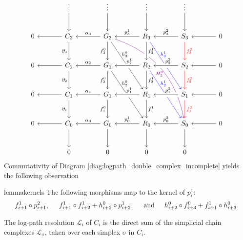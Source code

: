 \begin{equation} \label{diag:logpath_double_complex}
\begin{tikzcd} [column sep=large,row sep=large]
& \vdots \arrow[d] & \vdots \arrow[d] & \vdots \arrow[d] & \vdots \arrow[d] \\
0 & C_3 \arrow[l] \arrow[d,swap,"\partial_3"] & G_3 \arrow[l,swap,"\alpha_3"] \arrow[d,swap,"f_3^0"] \arrow[ddr,"h_3^0"{xshift=-10pt,yshift=10pt}] \arrow[dddrr,violet,bend left,"H_3^0"{xshift=-10pt,yshift=-14pt}] & R_3 \arrow[l,swap,"p_3^1"] \arrow[d,crossing over,"f_3^1"] \arrow[ddr,blue,"h_3^1"{xshift=-10pt,yshift=10pt}] & S_3 \arrow[l,swap,"p^2_3"] \arrow[d,red,"f_3^2"] & 0 \arrow[l] \\
0 & C_2 \arrow[l] \arrow[d,swap,"\partial_2"] & G_2 \arrow[l,swap,"\alpha_2"] \arrow[d,swap,"f_2^0"] \arrow[ddr,"h_2^0"{xshift=-10pt,yshift=10pt}] & R_2 \arrow[l,swap,"p_2^1"{xshift=3pt},crossing over] \arrow[d,"f_2^1"] \arrow[ddr,blue,"h_2^1"{xshift=-10pt,yshift=10pt}] & S_2 \arrow[l,swap,"p^2_2"{xshift=3pt},crossing over] \arrow[d,red,"f_2^2"] & 0 \arrow[l] \\
0 & C_1 \arrow[l] \arrow[d,swap,"\partial_1"] & G_1 \arrow[l,swap,"\alpha_1"] \arrow[d,swap,"f_1^0"] & R_1 \arrow[l,swap,"p_1^1"{xshift=3pt},crossing over] \arrow[d,"f_1^1"] & S_1 \arrow[l,swap,"p^2_1"{xshift=3pt},crossing over] \arrow[d,red,"f_1^2"] & 0 \arrow[l] \\
0 & C_0 \arrow[l] \arrow[d] & G_0 \arrow[l,swap,"\alpha_0"] \arrow[d] & R_0 \arrow[l,swap,"p_0^1"] \arrow[d] & S_0 \arrow[l,swap,"p^2_0"] \arrow [d]& 0 \arrow[l] \\
& 0 & 0 & 0 & 0
\end{tikzcd}
\end{equation} 
%
%
Commutativity of Diagram \eqref{diag:logpath_double_complex_incomplete} yields the following observation
%
\begin{restatable}{lemma}{kernels}
 \label{lem:kernels}
The following morphisms map to the kernel of $p^1_{i}$:
\begin{equation}
    \label{eq:logpath_morphisms}
f^1_{i+1}\circ p^2_{i+1} , \hspace{0.5cm} f^1_{i+1}\circ f^1_{i+2} + h^0_{i+2}\circ p^1_{i+2} ,  \hspace{0.5cm} \text{and} \hspace{0.5cm} h^0_{i+2}\circ f^0_{i+3} + f^1_{i+1} \circ h^0_{i+3} .
\end{equation}   
\end{restatable}
%
%
The log-path resolution $\mathcal{L}_i$ of $C_i$ is the direct sum of the simplicial chain complexes $\mathcal{L}_\sigma$, taken over each simplex $\sigma$ in $C_i$.

